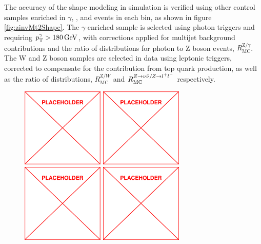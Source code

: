 The accuracy of the \mttwo shape modeling in simulation is verified using other control samples enriched in $\gamma$, \wlnu, and \zll events in each \HT bin, as shown in figure \ref{fig:zinvMt2Shape}. The $\gamma$-enriched sample is selected using photon triggers and requiring $p_{\mathrm{T}}^{\gamma} > 180\,\text{Ge\hspace{-.08em}V}$, with corrections applied for multijet background contributions and the ratio of \mttwo distributions for photon to Z boson events, $R_{\mathrm{MC}}^{\mathrm{Z}/\gamma}$. The W and Z boson samples are selected in data using leptonic triggers, corrected to compensate for the contribution from top quark production, as well as the ratio of \mttwo distributions, $R_{\mathrm{MC}}^{\mathrm{Z}/W}$ and $R_{\mathrm{MC}}^{Z\rightarrow\nu\bar{\nu}/Z\rightarrow l^+ l^-}$ respectively.
\begin{figure}
	\centering
	\includegraphics[width=0.35\textwidth]{figs/placeholder}
	\includegraphics[width=0.35\textwidth]{figs/placeholder}
	\includegraphics[width=0.35\textwidth]{figs/placeholder}
	\includegraphics[width=0.35\textwidth]{figs/placeholder}

\end{figure}
